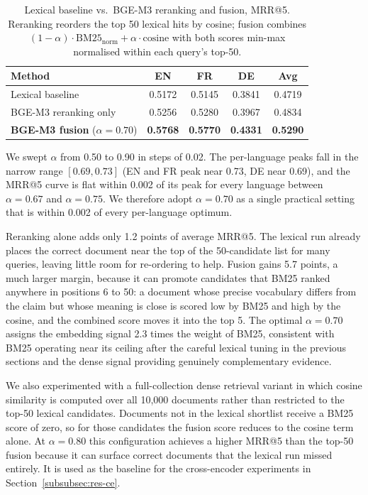 \begin{table}[!ht]
    \caption{Lexical baseline vs.\ BGE-M3 reranking and fusion, MRR@5. Reranking reorders the top 50 lexical hits by cosine; fusion combines $(1{-}\alpha)\cdot \text{BM25}_{\text{norm}} + \alpha\cdot \text{cosine}$ with both scores min-max normalised within each query's top-50.}
    \label{tab:bge-fusion}
    \centering
    \begin{tabular}{lcccc}
        \toprule
        Method & EN & FR & DE & Avg \\
        \midrule
        Lexical baseline                          & 0.5172 & 0.5145 & 0.3841 & 0.4719 \\
        BGE-M3 reranking only                     & 0.5256 & 0.5280 & 0.3967 & 0.4834 \\
        \textbf{BGE-M3 fusion} ($\alpha{=}0.70$)  & \textbf{0.5768} & \textbf{0.5770} & \textbf{0.4331} & \textbf{0.5290} \\
        \bottomrule
    \end{tabular}
\end{table}

We swept $\alpha$ from 0.50 to 0.90 in steps of 0.02. The per-language peaks fall in the narrow range $[0.69, 0.73]$ (EN and FR peak near 0.73, DE near 0.69), and the MRR@5 curve is flat within 0.002 of its peak for every language between $\alpha{=}0.67$ and $\alpha{=}0.75$. We therefore adopt $\alpha{=}0.70$ as a single practical setting that is within 0.002 of every per-language optimum.

Reranking alone adds only 1.2 points of average MRR@5. The lexical run already places the correct document near the top of the 50-candidate list for many queries, leaving little room for re-ordering to help. Fusion gains 5.7 points, a much larger margin, because it can promote candidates that BM25 ranked anywhere in positions 6 to 50: a document whose precise vocabulary differs from the claim but whose meaning is close is scored low by BM25 and high by the cosine, and the combined score moves it into the top 5. The optimal $\alpha{=}0.70$ assigns the embedding signal 2.3 times the weight of BM25, consistent with BM25 operating near its ceiling after the careful lexical tuning in the previous sections and the dense signal providing genuinely complementary evidence.

We also experimented with a full-collection dense retrieval variant in which cosine similarity is computed over all 10,000 documents rather than restricted to the top-50 lexical candidates. Documents not in the lexical shortlist receive a BM25 score of zero, so for those candidates the fusion score reduces to the cosine term alone. At $\alpha{=}0.80$ this configuration achieves a higher MRR@5 than the top-50 fusion because it can surface correct documents that the lexical run missed entirely. It is used as the baseline for the cross-encoder experiments in Section~\ref{subsubsec:res-ce}.

